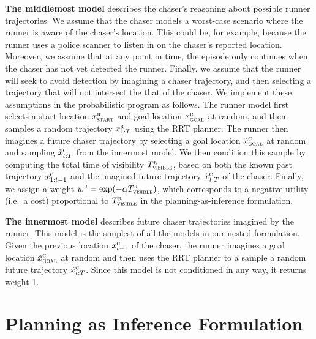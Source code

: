 \documentclass[twoside]{article}
\begin{document}
\textbf{The middlemost model} describes the chaser's reasoning about possible runner trajectories. %
We assume that the chaser models a worst-case scenario where the runner is aware of the chaser's location. This could be, for example, because the runner uses a police scanner to listen in on the chaser's reported location.
Moreover, we assume that at any point in time, the episode only continues when the chaser has not yet detected the runner. Finally, we assume that the runner will seek to avoid detection by imagining a chaser trajectory, and then selecting a trajectory that will not intersect the that of the chaser. We implement these assumptions in the probabilistic program as follows. The runner model first selects a start location $x^\textsc{r}_\textsc{start}$ and goal location $x^\textsc{r}_\textsc{goal}$ at random, and then samples a random trajectory $x^\textsc{r}_{1:T}$ using the RRT planner. The runner then imagines a future chaser trajectory by selecting a goal location $\tilde{x}^\textsc{c}_\textsc{goal}$ at random and sampling $\tilde{x}^\textsc{c}_{t:T}$ from the innermost model. We then condition this sample by computing the total time of visibility $T^\textsc{r}_\textsc{visible}$, based on both the known past trajectory $x^\textsc{c}_{1:t-1}$ and the imagined future trajectory $\tilde{x}^\textsc{c}_{t:T}$ of the chaser. Finally, we assign a weight $w^\textsc{r} = \exp(-\alpha T^\textsc{r}_\textsc{visible})$, which corresponds to a negative utility (i.e.~a cost) proportional to $T^\textsc{r}_\textsc{visible}$ in the planning-as-inference formulation.

\textbf{The innermost model} describes future chaser trajectories imagined by the runner. This model is the simplest of all the models in our nested formulation. Given the previous location $x^\textsc{c}_{t-1}$ of the chaser, the runner imagines a goal location $\tilde{x}^\textsc{c}_\textsc{goal}$ at random and then uses the RRT planner to a sample a random future trajectory $\tilde{x}^\textsc{c}_{t:T}$. Since this model is not conditioned in any way, it returns weight 1.

\section{Planning as Inference Formulation}
\end{document}
